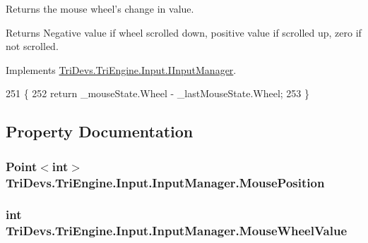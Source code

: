 Returns the mouse wheel's change in value. 

\begin{DoxyReturn}{Returns}
Negative value if wheel scrolled down, positive value if scrolled up, zero if not scrolled.
\end{DoxyReturn}


Implements \hyperlink{interface_tri_devs_1_1_tri_engine_1_1_input_1_1_i_input_manager_a5818166c617e003f3ff25c178eefaf5c}{Tri\-Devs.\-Tri\-Engine.\-Input.\-I\-Input\-Manager}.


\begin{DoxyCode}
251         \{
252             \textcolor{keywordflow}{return} \_mouseState.Wheel - \_lastMouseState.Wheel;
253         \}
\end{DoxyCode}


\subsection{Property Documentation}
\hypertarget{class_tri_devs_1_1_tri_engine_1_1_input_1_1_input_manager_ad491f207df133852e384efbac8bd5702}{
\subsubsection[{Mouse\-Position}]{\setlength{\rightskip}{0pt plus 5cm}Point$<$int$>$ Tri\-Devs.\-Tri\-Engine.\-Input.\-Input\-Manager.\-Mouse\-Position\hspace{0.3cm}{\ttfamily [get]}}}\label{class_tri_devs_1_1_tri_engine_1_1_input_1_1_input_manager_ad491f207df133852e384efbac8bd5702}
\hypertarget{class_tri_devs_1_1_tri_engine_1_1_input_1_1_input_manager_ab6300bba2a768e03bd0bfd65cf8f8991}{
\subsubsection[{Mouse\-Wheel\-Value}]{\setlength{\rightskip}{0pt plus 5cm}int Tri\-Devs.\-Tri\-Engine.\-Input.\-Input\-Manager.\-Mouse\-Wheel\-Value\hspace{0.3cm}{\ttfamily [get]}}}\label{class_tri_devs_1_1_tri_engine_1_1_input_1_1_input_manager_ab6300bba2a768e03bd0bfd65cf8f8991}
